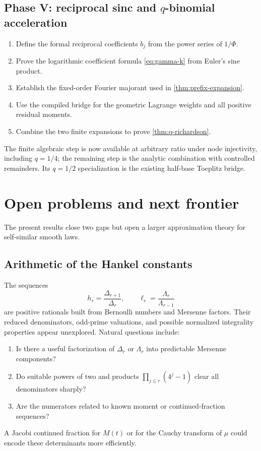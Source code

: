 \documentclass[11pt]{article}
\numberwithin{equation}{section}
\theoremstyle{definition}
\theoremstyle{remark}
\begin{document}
\subsection{Phase V: reciprocal sinc and $q$-binomial acceleration}

\begin{enumerate}
\item Define the formal reciprocal coefficients $b_j$ from the power series of $1/\Phi$.
\item Prove the logarithmic coefficient formula \eqref{eq:gamma-k} from Euler's sine product.
\item Establish the fixed-order Fourier majorant used in \cref{thm:prefix-expansion}.
\item Use the compiled  bridge for the geometric Lagrange weights and all positive residual moments.
\item Combine the two finite expansions to prove \cref{thm:q-richardson}.
\end{enumerate}
The finite algebraic step is now available at arbitrary ratio under node
injectivity, including \(q=1/4\); the remaining step is the analytic
combination with controlled remainders.  Its \(q=1/2\) specialization is the
existing half-base Toeplitz bridge.

\section{Open problems and next frontier}
\label{sec:open}

The present results close two gaps but open a larger approximation theory for self-similar smooth laws.

\subsection{Arithmetic of the Hankel constants}

The sequences
\begin{equation}
 h_r=\frac{\Delta_{r+1}}{\Delta_r},
 \qquad
 \ell_r=\frac{\Lambda_r}{\Lambda_{r-1}}
 \label{eq:two-constant-sequences}
\end{equation}
are positive rationals built from Bernoulli numbers and Mersenne factors.  Their reduced denominators, odd-prime valuations, and possible normalized integrality properties appear unexplored.  Natural questions include:
\begin{enumerate}
\item Is there a useful factorization of $\Delta_r$ or $\Lambda_r$ into predictable Mersenne components?
\item Do suitable powers of two and products $\prod_{j\le r}(4^j-1)$ clear all denominators sharply?
\item Are the numerators related to known moment or continued-fraction sequences?
\end{enumerate}
A Jacobi continued fraction for $M(t)$ or for the Cauchy transform of $\mu$ could encode these determinants more efficiently.
\end{document}
